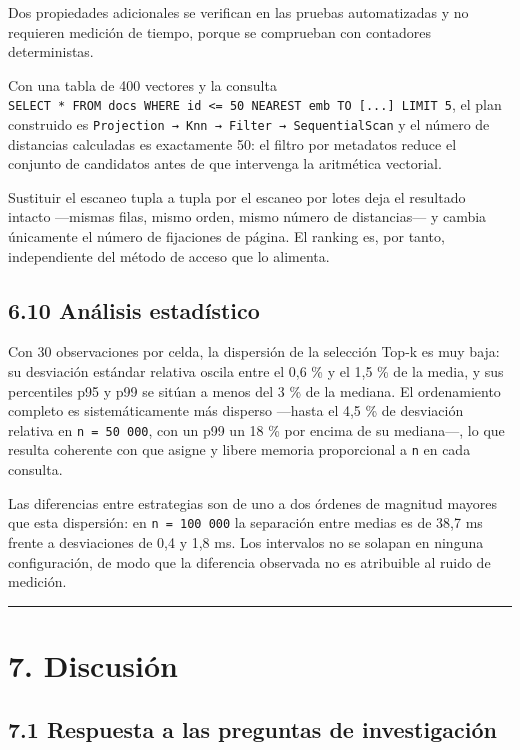 \documentclass[11pt,a4paper]{article}
\let\pandocsubsection\subsection
\let\subsection\section
\let\subsubsection\pandocsubsection
\begin{document}
Dos propiedades adicionales se verifican en las pruebas automatizadas y
no requieren medición de tiempo, porque se comprueban con contadores
deterministas.

Con una tabla de 400 vectores y la consulta
\texttt{SELECT\ *\ FROM\ docs\ WHERE\ id\ \textless{}=\ 50\ NEAREST\ emb\ TO\ {[}...{]}\ LIMIT\ 5},
el plan construido es
\texttt{Projection\ →\ Knn\ →\ Filter\ →\ SequentialScan} y el número de
distancias calculadas es exactamente 50: el filtro por metadatos reduce
el conjunto de candidatos antes de que intervenga la aritmética
vectorial.

Sustituir el escaneo tupla a tupla por el escaneo por lotes deja el
resultado intacto ---mismas filas, mismo orden, mismo número de
distancias--- y cambia únicamente el número de fijaciones de página. El
ranking es, por tanto, independiente del método de acceso que lo
alimenta.

\subsubsection{6.10 Análisis
estadístico}\label{610-anuxe1lisis-estaduxedstico}

Con 30 observaciones por celda, la dispersión de la selección Top-k es
muy baja: su desviación estándar relativa oscila entre el 0,6 \% y el
1,5 \% de la media, y sus percentiles p95 y p99 se sitúan a menos del 3
\% de la mediana. El ordenamiento completo es sistemáticamente más
disperso ---hasta el 4,5 \% de desviación relativa en
\texttt{n\ =\ 50\ 000}, con un p99 un 18 \% por encima de su mediana---,
lo que resulta coherente con que asigne y libere memoria proporcional a
\texttt{n} en cada consulta.

Las diferencias entre estrategias son de uno a dos órdenes de magnitud
mayores que esta dispersión: en \texttt{n\ =\ 100\ 000} la separación
entre medias es de 38,7 ms frente a desviaciones de 0,4 y 1,8 ms. Los
intervalos no se solapan en ninguna configuración, de modo que la
diferencia observada no es atribuible al ruido de medición.

\begin{center}\rule{0.5\linewidth}{0.5pt}\end{center}

\subsection{7. Discusión}\label{7-discusiuxf3n}

\subsubsection{7.1 Respuesta a las preguntas de
investigación}\label{71-respuesta-a-las-preguntas-de-investigaciuxf3n}
\end{document}
